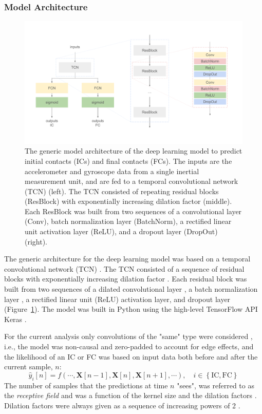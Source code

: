 \documentclass[sensors,article,submit,pdftex,moreauthors]{Definitions/mdpi}
\begin{document}
\subsubsection{Model Architecture \label{subsubsec:Model_Architecture}}
\begin{figure}[H]
	\centering
	\includegraphics[width=13.5cm]{fig/methods_tcn_arch.pdf}
	\caption{The generic model architecture of the deep learning model to predict initial contacts (ICs) and final contacts (FCs). The inputs are the accelerometer and gyroscope data from a single inertial measurement unit, and are fed to a temporal convolutional network (TCN) (left). The TCN consisted of repeating residual blocks (ResBlock) with exponentially increasing dilation factor (middle). Each ResBlock was built from two sequences of a convolutional layer (Conv), batch normalization layer (BatchNorm), a rectified linear unit activation layer (ReLU), and a dropout layer (DropOut) (right). \label{fig:methods_tcn_arch}}
\end{figure} 
The generic architecture for the deep learning model was based on a temporal convolutional network (TCN) \cite{Bai2018,Remy2020,Filtjens2020}. The TCN consisted of a sequence of residual blocks with exponentially increasing dilation factor \cite{YuKoltun2016,Bai2018}. Each residual block was built from two sequences of a dilated convolutional layer \cite{YuKoltun2016}, a batch normalization layer \cite{Ioffe2015}, a rectified linear unit (ReLU) activation layer, and dropout layer \cite{Srivastava2014} (Figure~\ref{fig:methods_tcn_arch}). The model was built in Python \cite{VanRossum2009} using the high-level TensorFlow API Keras \cite{Chollet2015,Remy2020}. 

For the current analysis only convolutions of the "same" type were considered \cite{Remy2020}, i.e., the model was non-causal and zero-padded to account for edge effects, and the likelihood of an IC or FC was based on input data both before and after the current sample, $n$:
\begin{equation}
	\hat{y}_{i}[n] = f(\cdots,\mathbf{X}[n-1],\mathbf{X}[n],\mathbf{X}[n+1],\cdots), \quad i \in \left\{ \mathrm{IC}, \mathrm{FC}\right\}
	\label{eqn:predictions}
\end{equation}
The number of samples that the predictions at time $n$ "sees", was referred to as the \emph{receptive field} \cite{Lea2017} and was a function of the kernel size and the dilation factors \cite{Remy2020}. Dilation factors were always given as a sequence of increasing powers of 2 \cite{VanDenOord2016,YuKoltun2016,Bai2018}. 
\end{document}
